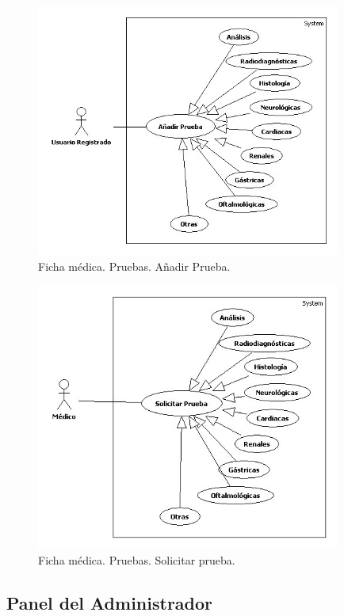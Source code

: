 					\begin{figure}[H]
					  \centering
					    \includegraphics[width=10cm]{img/jpg/casos_uso/Add_Prueba.jpg}
					  \caption{Ficha médica. Pruebas. Añadir Prueba.}
					  \label{fig:pruebas_add_fic}
					\end{figure}

					\begin{figure}[H]
					  \centering
					    \includegraphics[width=10cm]{img/jpg/casos_uso/Solicitar_Prueba.jpg}
					  \caption{Ficha médica. Pruebas. Solicitar prueba.}
					  \label{fig:pruebas_sol_fic}
					\end{figure}


			\subsection{Panel del Administrador} %
			\label{sec:panel_del_administrador}

